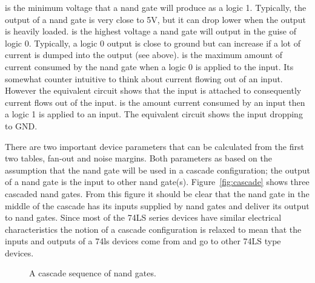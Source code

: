 \VOH is the minimum voltage that a nand gate will produce as a
logic 1.  Typically, the output of a nand gate is very close to 5V,
but it can drop lower when the output is heavily loaded.  \VOL is the
highest voltage a nand gate will output in the guise of logic 0.
Typically, a logic 0 output is close to ground but can increase if
a lot of current is dumped into the output (see \IOL above).  \IIL is
the maximum amount of current consumed by the nand gate when a logic
0 is applied to the input.  Its somewhat counter intuitive to think
about current flowing out of an input.  However the equivalent circuit
shows that the input is attached to \VCC consequently current flows
out of the input.  \IIH is the amount current consumed by an input
then a logic 1 is applied to an input.  The equivalent circuit shows
the input dropping to GND.

There are two important device parameters that can be calculated
from the first two tables, fan-out and noise margins.  Both parameters
as based on the assumption that the nand gate will be used in a cascade
configuration;  the output of a nand
    gate is the input to other nand gate(s).  Figure~\ref{fig:cascade}
    shows three cascaded nand gates.  From this figure it should be clear
    that the nand gate in the middle of the cascade has its inputs
    supplied by nand gates and deliver its output to nand gates.  Since
    most of the 74LS series devices have similar electrical
    characteristics the notion of a cascade
    configuration is relaxed to mean that the inputs and outputs of a
    74ls devices come from and go to other 74LS type devices.

    \begin{figure}[ht]
        \caption{A cascade sequence of nand gates.}
        \label{fig:cascade_conf}
    \end{figure}


